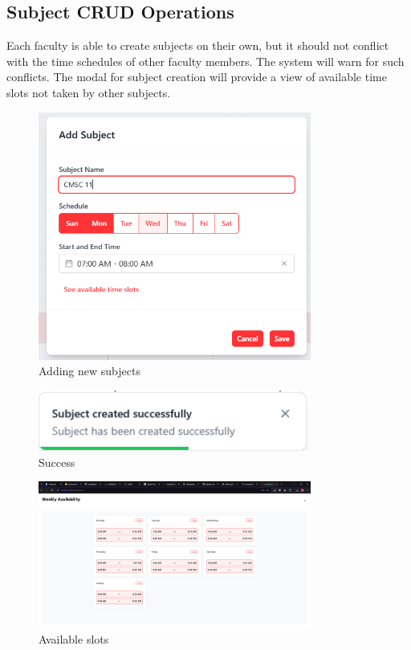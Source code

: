 \subsection{Subject CRUD Operations}
Each faculty is able to create subjects on their own, but it should not conflict with the time schedules of other faculty members. The system will warn for such conflicts. The modal for subject creation will provide a view of available time slots not taken by other subjects.
\begin{figure}[h] %
	\centering
	\includegraphics[width=0.8\textwidth]{figures/chapter4/subject_add.png} %
	\caption{Adding new subjects}
	\label{fig:subject_add}
\end{figure}
\begin{figure}[h] %
	\centering
	\includegraphics[width=0.8\textwidth]{figures/chapter4/subject_add_success.png} %
	\caption{Success}
	\label{fig:subject_add_success}
\end{figure}
\clearpage
\begin{figure}[h] %
	\centering
	\includegraphics[width=0.8\textwidth]{figures/chapter4/subject_availability.png} %
	\caption{Available slots}
	\label{fig:subject_availability}
\end{figure}
